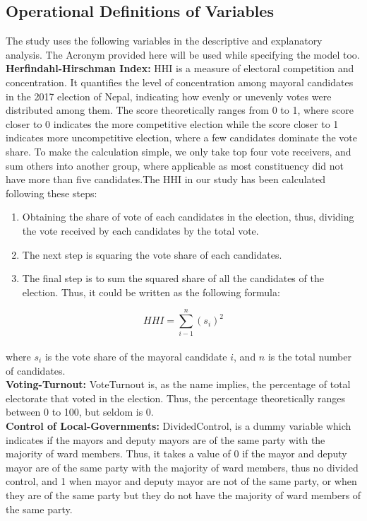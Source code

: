 \subsection{Operational Definitions of Variables}
The study uses the following variables in the descriptive and explanatory analysis. The Acronym provided here will be used while specifying the model too.\\
\textbf{Herfindahl-Hirschman Index:} HHI is a measure of electoral competition and concentration. It quantifies the level of concentration among mayoral candidates in the 2017 election of Nepal, indicating how evenly or unevenly votes were distributed among them. The score theoretically ranges from 0 to 1, where score closer to 0 indicates the more competitive election while the score closer to 1 indicates more uncompetitive election, where a few candidates dominate the vote share. To make the calculation simple, we only take top four vote receivers, and sum others into another group, where applicable as most constituency did not have more than five candidates.The HHI in our study has been calculated following these steps:\\
\begin{enumerate}[label=\roman*.]  
     \item Obtaining the share of vote of each candidates in the election, thus, dividing the vote received by each candidates by the total vote.
    \item The next step is squaring the vote share of each candidates.
    \item The final step is to sum the squared share of all the candidates of the election. Thus, it could be written as the following formula:
\end{enumerate}
\[HHI =\sum_{i-1}^{n}(s_i)^2\]\\ 
where \(s_i \) is the vote share of the mayoral candidate \( i \), and \( n \) is the total number of candidates.\\
\textbf{Voting-Turnout:} VoteTurnout is, as the name implies, the percentage of total electorate that voted in the election. Thus, the percentage theoretically ranges between 0 to 100, but seldom is 0. \\
\textbf{Control of Local-Governments:} DividedControl, is a dummy variable which indicates if the mayors and deputy mayors are of the same party with the majority of ward members. Thus, it takes a value of 0 if the mayor and deputy mayor are of the same party with the majority of ward members, thus no divided control, and 1 when mayor and deputy mayor are not of the same party, or when they are of the same party but they do not have the majority of ward members of the same party.\\
